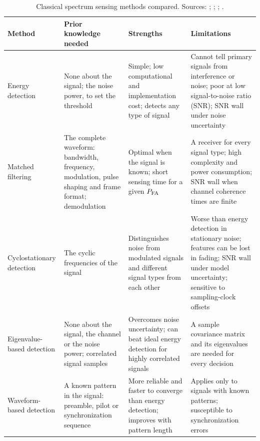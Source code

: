 \begin{table}[tbp]
  \centering
  \small
  \caption[Classical spectrum sensing methods compared]{Classical spectrum sensing methods compared. Sources: \textcite[pp.~120--124]{yucek2009}; \textcite[pp.~322--324]{axell2010}; \textcite{zeng2009}; \textcite{tandra2008}.}
  \label{tab:sensing-methods}
  \begin{tabularx}{\textwidth}{@{} >{\raggedright\arraybackslash}p{2.7cm} >{\raggedright\arraybackslash}X >{\raggedright\arraybackslash}X >{\raggedright\arraybackslash}X @{}}
    \toprule
    Method & Prior knowledge needed & Strengths & Limitations \\
    \midrule
    Energy detection & None about the signal; the noise power, to set the threshold & Simple; low computational and implementation cost; detects any type of signal & Cannot tell primary signals from interference or noise; poor at low signal-to-noise ratio (SNR); SNR wall under noise uncertainty \\
    \addlinespace
    Matched filtering & The complete waveform: bandwidth, frequency, modulation, pulse shaping and frame format; demodulation & Optimal when the signal is known; short sensing time for a given $P_{\mathrm{FA}}$ & A receiver for every signal type; high complexity and power consumption; SNR wall when channel coherence times are finite \\
    \addlinespace
    Cyclostationary detection & The cyclic frequencies of the signal & Distinguishes noise from modulated signals and different signal types from each other & Worse than energy detection in stationary noise; features can be lost in fading; SNR wall under model uncertainty; sensitive to sampling-clock offsets \\
    \addlinespace
    Eigenvalue-based detection & None about the signal, the channel or the noise power; correlated signal samples & Overcomes noise uncertainty; can beat ideal energy detection for highly correlated signals & A sample covariance matrix and its eigenvalues are needed for every decision \\
    \addlinespace
    Waveform-based detection & A known pattern in the signal: preamble, pilot or synchronization sequence & More reliable and faster to converge than energy detection; improves with pattern length & Applies only to signals with known patterns; susceptible to synchronization errors \\
    \bottomrule
  \end{tabularx}
\end{table}

